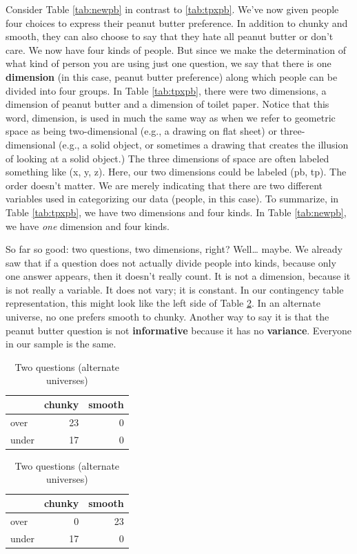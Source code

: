 \documentclass[openany]{book}
\begin{document}
Consider Table \ref{tab:newpb} in contrast to \ref{tab:tpxpb}. We've now given people four choices to express their peanut butter preference. In addition to chunky and smooth, they can also choose to say that they hate all peanut butter or don't care. We now have four kinds of people. But since we make the determination of what kind of person you are using just one question, we say that there is one \textbf{dimension} (in this case, peanut butter preference) along which people can be divided into four groups. In Table \ref{tab:tpxpb}, there were two dimensions, a dimension of peanut butter and a dimension of toilet paper. Notice that this word, dimension, is used in much the same way as when we refer to geometric space as being two-dimensional (e.g., a drawing on flat sheet) or three-dimensional (e.g., a solid object, or sometimes a drawing that creates the illusion of looking at a solid object.) The three dimensions of space are often labeled something like (x, y, z). Here, our two dimensions could be labeled (pb, tp). The order doesn't matter. We are merely indicating that there are two different variables used in categorizing our data (people, in this case). To summarize, in Table \ref{tab:tpxpb}, we have two dimensions and four kinds. In Table \ref{tab:newpb}, we have \emph{one} dimension and four kinds.

So far so good: two questions, two dimensions, right? Well\ldots{} maybe. We already saw that if a question does not actually divide people into kinds, because only one answer appears, then it doesn't really count. It is not a dimension, because it is not really a variable. It does not vary; it is constant. In our contingency table representation, this might look like the left side of Table \ref{tab:tpxpb-alt}. In an alternate universe, no one prefers smooth to chunky. Another way to say it is that the peanut butter question is not \textbf{informative} because it has no \textbf{variance}. Everyone in our sample is the same.

\begin{table}[!h]
\caption{\label{tab:tpxpb-alt}Two questions (alternate universes)}

\centering
\begin{tabular}[t]{lrr}
\toprule
  & chunky & smooth\\
\midrule
over & 23 & 0\\
under & 17 & 0\\
\bottomrule
\end{tabular}
\centering
\begin{tabular}[t]{lrr}
\toprule
  & chunky & smooth\\
\midrule
over & 0 & 23\\
under & 17 & 0\\
\bottomrule
\end{tabular}
\end{table}
\end{document}
